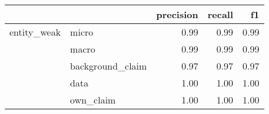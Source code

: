 \begin{tabular}{llrrr}
\toprule
            &           &  precision &  recall &   f1 \\
\midrule
entity\_weak & micro &       0.99 &    0.99 & 0.99 \\
            & macro &       0.99 &    0.99 & 0.99 \\
            & background\_claim &       0.97 &    0.97 & 0.97 \\
            & data &       1.00 &    1.00 & 1.00 \\
            & own\_claim &       1.00 &    1.00 & 1.00 \\
\bottomrule
\end{tabular}
